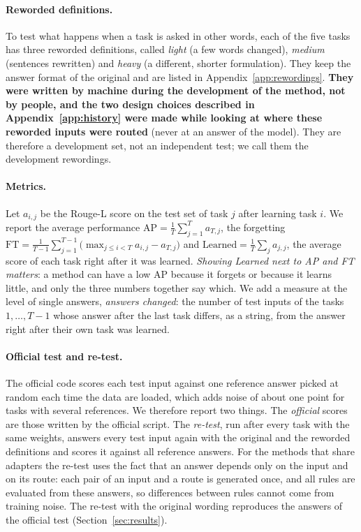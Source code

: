\paragraph{Reworded definitions.} To test what happens when a task is asked in other words, each of
the five tasks has three reworded definitions, called \emph{light} (a few words changed),
\emph{medium} (sentences rewritten) and \emph{heavy} (a different, shorter formulation). They keep the
answer format of the original and are listed in Appendix~\ref{app:rewordings}. \textbf{They were
written by machine during the development of the method, not by people, and the two design choices described in
Appendix~\ref{app:history} were made while looking at where these reworded inputs were routed} (never
at an answer of the model). They are therefore a development set, not an independent test; we call them the development rewordings.

\paragraph{Metrics.} Let $a_{i,j}$ be the Rouge-L score \citep{lin2004rouge} on the test set of task
$j$ after learning task $i$. We report the average performance
$\mathrm{AP} = \tfrac{1}{T}\sum_{j=1}^{T} a_{T,j}$, the forgetting
$\mathrm{FT} = \tfrac{1}{T-1}\sum_{j=1}^{T-1}\bigl(\max_{j \le i < T} a_{i,j} - a_{T,j}\bigr)$ and
$\mathrm{Learned} = \tfrac{1}{T}\sum_{j} a_{j,j}$, the average score of each task right after it was
learned. \emph{Showing Learned next to AP and FT matters}: a method can have a low AP because it
forgets or because it learns little, and only the three numbers together say which. We add a
measure at the level of single answers, \emph{answers changed}: the number of test inputs of the
tasks $1, \dots, T-1$ whose answer after the last task differs, as a string, from the answer right
after their own task was learned.

\paragraph{Official test and re-test.} The official code scores each test input against one
reference answer picked at random each time the data are loaded, which adds noise of about one
point for tasks with several references. We therefore report two things. The \emph{official} scores
are those written by the official script. The \emph{re-test}, run after every task with the same
weights, answers every test input again with the original and the reworded definitions and scores
it against all reference answers. For the methods that share adapters the re-test uses the fact
that an answer depends only on the input and on its route: each pair of an input and a route is
generated once, and all rules are evaluated from these answers, so differences between rules cannot
come from training noise. The re-test with the original wording reproduces the answers of the
official test (Section~\ref{sec:results}).

